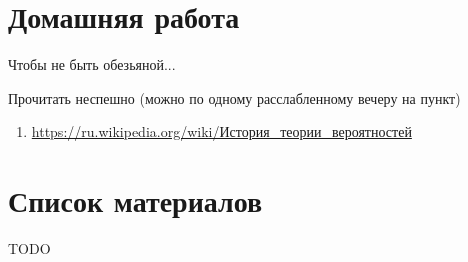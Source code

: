 \section{Домашняя работа}

\begin{frame}{Чтобы не быть обезьяной...}
	
Прочитать неспешно
(можно по одному расслабленному вечеру на пункт)
\begin{enumerate}
	\item \url{https://ru.wikipedia.org/wiki/История_теории_вероятностей}
\end{enumerate}

\end{frame}


\section{Список материалов}

\begin{frame}

TODO



\end{frame}

  
